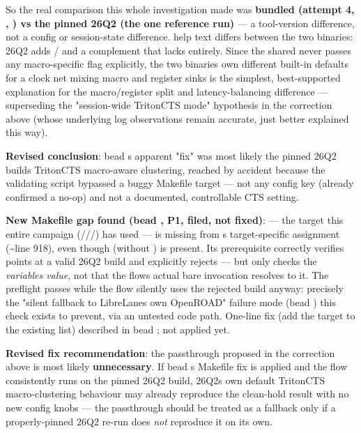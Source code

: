 \begin{record}
So the real comparison this whole investigation made was \textbf{bundled
 (attempt 4, , ) vs the
pinned 26Q2 (the one reference run)} --- a tool-version difference, not
a config or session-state difference.  help
text differs between the two binaries: 26Q2 adds
/ and a
 complement that  lacks
entirely. Since the shared  never passes any
macro-specific flag explicitly, the two binaries\textquotesingle{} own
different built-in defaults for a clock net mixing macro and register
sinks is the simplest, best-supported explanation for the
macro/\allowbreak{}register split and latency-balancing difference ---
superseding the "session-wide TritonCTS mode" hypothesis in the
correction above (whose underlying log observations remain accurate,
just better explained this way).

\textbf{Revised conclusion}: bead \textquotesingle s apparent
"fix" was most likely the pinned 26Q2 build\textquotesingle s TritonCTS
macro-aware clustering, reached by accident because the validating
script bypassed a buggy Makefile target --- not any config key (already
confirmed a no-op) and not a documented, controllable CTS setting.

\textbf{New Makefile gap found (bead , P1,
filed, not fixed)}:  --- the
target this entire campaign
(///) has used --- is missing
from \textquotesingle s target-specific
 assignment (\textasciitilde line 918), even though
 (without ) is present.
Its prerequisite  correctly verifies
 points at a valid 26Q2 build and explicitly
rejects  --- but only checks the
\emph{variable\textquotesingle s value}, not that the
flow\textquotesingle s actual bare  invocation resolves
to it. The preflight passes while the flow silently uses the rejected
build anyway: precisely the "silent fallback to
LibreLane\textquotesingle s own OpenROAD" failure mode (bead )
this check exists to prevent, via an untested code path. One-line fix
(add the target to the existing list) described in bead ; not
applied yet.

\textbf{Revised fix recommendation}: the  passthrough
proposed in the correction above is most likely \textbf{unnecessary}. If
bead \textquotesingle s Makefile fix is applied and the flow
consistently runs on the pinned 26Q2 build, 26Q2\textquotesingle s own
default TritonCTS macro-clustering behaviour may already reproduce the
clean-hold result with no new config knobs --- the passthrough should be
treated as a fallback only if a properly-pinned 26Q2 re-run does
\emph{not} reproduce it on its own.


\end{record}
